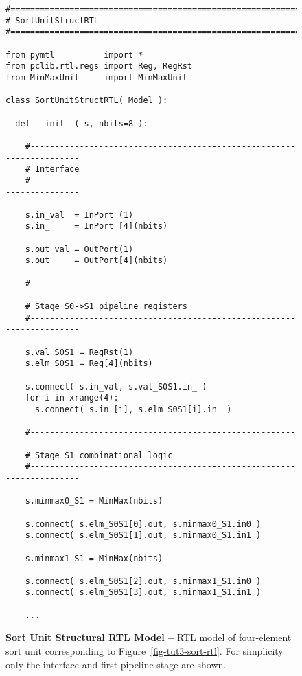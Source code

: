 
\begin{figure}[b]

  \begin{lstlisting}[xleftmargin={0.9in}]
#=========================================================================
# SortUnitStructRTL
#=========================================================================

from pymtl          import *
from pclib.rtl.regs import Reg, RegRst
from MinMaxUnit     import MinMaxUnit

class SortUnitStructRTL( Model ):

  def __init__( s, nbits=8 ):

    #---------------------------------------------------------------------
    # Interface
    #---------------------------------------------------------------------

    s.in_val  = InPort (1)
    s.in_     = InPort [4](nbits)

    s.out_val = OutPort(1)
    s.out     = OutPort[4](nbits)

    #---------------------------------------------------------------------
    # Stage S0->S1 pipeline registers
    #---------------------------------------------------------------------

    s.val_S0S1 = RegRst(1)
    s.elm_S0S1 = Reg[4](nbits)

    s.connect( s.in_val, s.val_S0S1.in_ )
    for i in xrange(4):
      s.connect( s.in_[i], s.elm_S0S1[i].in_ )

    #---------------------------------------------------------------------
    # Stage S1 combinational logic
    #---------------------------------------------------------------------

    s.minmax0_S1 = MinMax(nbits)

    s.connect( s.elm_S0S1[0].out, s.minmax0_S1.in0 )
    s.connect( s.elm_S0S1[1].out, s.minmax0_S1.in1 )

    s.minmax1_S1 = MinMax(nbits)

    s.connect( s.elm_S0S1[2].out, s.minmax1_S1.in0 )
    s.connect( s.elm_S0S1[3].out, s.minmax1_S1.in1 )

    ...
\end{lstlisting}

  \caption{\textbf{Sort Unit Structural RTL Model --} RTL model of
    four-element sort unit corresponding to
    Figure~\ref{fig-tut3-sort-rtl}. For simplicity only the
    interface and first pipeline stage are shown.}
  \label{code-tut3-sort-rtl-struct}

\end{figure}

